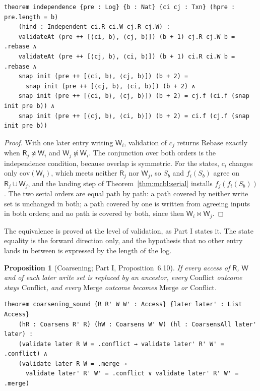 \documentclass[11pt,letterpaper]{article}
\newtheorem{proposition}[theorem]{Proposition}
\theoremstyle{definition}
\theoremstyle{remark}
\newcommand{\R}{\mathsf{R}}
\newcommand{\W}{\mathsf{W}}
\newcommand{\Snap}[1]{S_{#1}}
\newcommand{\meets}{\bowtie}
\newcommand{\nmeets}{\not\bowtie}
\newcommand{\op}[1]{\mathrm{#1}}
\newcommand{\covd}{\op{cov}}
\newcommand{\Rb}{\mathrm{Rebase}}
\newcommand{\Mg}{\mathrm{Merge}}
\newcommand{\Cf}{\mathrm{Conflict}}
\begin{document}
\begin{lstlisting}[language=Lean,caption={Independence in the log (\texttt{YonedaTx/Serializability.lean})},label={lst:mcbl:indepstate}]
theorem independence {pre : Log} {b : Nat} {ci cj : Txn} (hpre : pre.length = b)
    (hind : Independent ci.R ci.W cj.R cj.W) :
    validateAt (pre ++ [⟨ci, b⟩, ⟨cj, b⟩]) (b + 1) cj.R cj.W b = .rebase ∧
    validateAt (pre ++ [⟨cj, b⟩, ⟨ci, b⟩]) (b + 1) ci.R ci.W b = .rebase ∧
    snap init (pre ++ [⟨ci, b⟩, ⟨cj, b⟩]) (b + 2) =
      snap init (pre ++ [⟨cj, b⟩, ⟨ci, b⟩]) (b + 2) ∧
    snap init (pre ++ [⟨ci, b⟩, ⟨cj, b⟩]) (b + 2) = cj.f (ci.f (snap init pre b)) ∧
    snap init (pre ++ [⟨cj, b⟩, ⟨ci, b⟩]) (b + 2) = ci.f (cj.f (snap init pre b))
\end{lstlisting}

\begin{proof}
With one later entry writing $\W_i$, validation of $c_j$ returns $\Rb$ exactly when $\R_j\nmeets\W_i$ and $\W_j\nmeets\W_i$. The conjunction over both orders is the independence condition, because overlap is symmetric. For the states, $c_i$ changes only $\covd(\W_i)$, which meets neither $\R_j$ nor $\W_j$, so $\Snap{b}$ and $f_i(\Snap{b})$ agree on $\R_j\cup\W_j$, and the landing step of Theorem~\ref{thm:mcbl:serial} installs $f_j(f_i(\Snap{b}))$. The two serial orders are equal path by path: a path covered by neither write set is unchanged in both; a path covered by one is written from agreeing inputs in both orders; and no path is covered by both, since then $\W_i\meets\W_j$.
\end{proof}

The equivalence is proved at the level of validation, as Part I states it. The state equality is the forward direction only, and the hypothesis that no other entry lands in between is expressed by the length of the log.

\begin{proposition}[Coarsening; Part I, Proposition~6.10]
\label{prop:mcbl:coarsen}
If every access of $\R$, $\W$ and of each later write set is replaced by an ancestor, every $\Cf$ outcome stays $\Cf$, and every $\Mg$ outcome becomes $\Mg$ or $\Cf$.
\end{proposition}

\begin{lstlisting}[language=Lean,caption={Coarsening is sound (\texttt{YonedaTx/Validation.lean})},label={lst:mcbl:coarsen}]
theorem coarsening_sound {R R' W W' : Access} {later later' : List Access}
    (hR : Coarsens R' R) (hW : Coarsens W' W) (hl : CoarsensAll later' later) :
    (validate later R W = .conflict → validate later' R' W' = .conflict) ∧
    (validate later R W = .merge →
      validate later' R' W' = .conflict ∨ validate later' R' W' = .merge)
\end{lstlisting}
\end{document}
